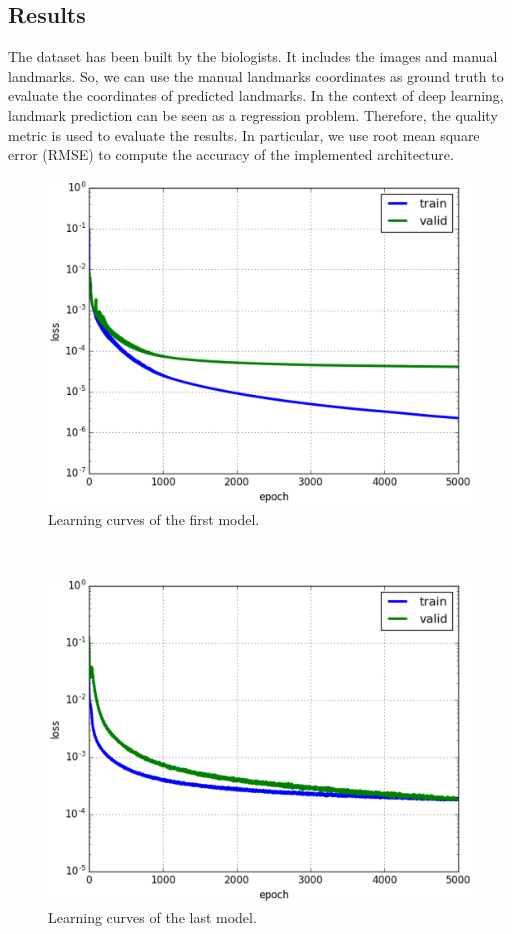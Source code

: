 \documentclass[conference]{IEEEtran}
\begin{document}
\subsection{Results}
The dataset has been built by the biologists. It includes the images and manual landmarks. So, we can use the manual landmarks coordinates as ground truth to evaluate the coordinates of predicted landmarks. In the context of deep learning, landmark prediction can be seen as a regression problem. Therefore, the quality metric is used to evaluate the results. In particular, we use root mean square error (RMSE) to compute the accuracy of the implemented architecture. 
\begin{figure}[h!]
	\centerline{\includegraphics[scale=0.45]{images/loss_model_1.eps}}
	\caption{Learning curves of the first model.}
	\label{figloss1}
\end{figure}~\\
\begin{figure}[h!]
	\centerline{\includegraphics[scale=0.45]{images/loss_v16.eps}}
	\caption{Learning curves of the last model.}
	\label{figloss}
\end{figure}~\\[0.1cm]
\end{document}
